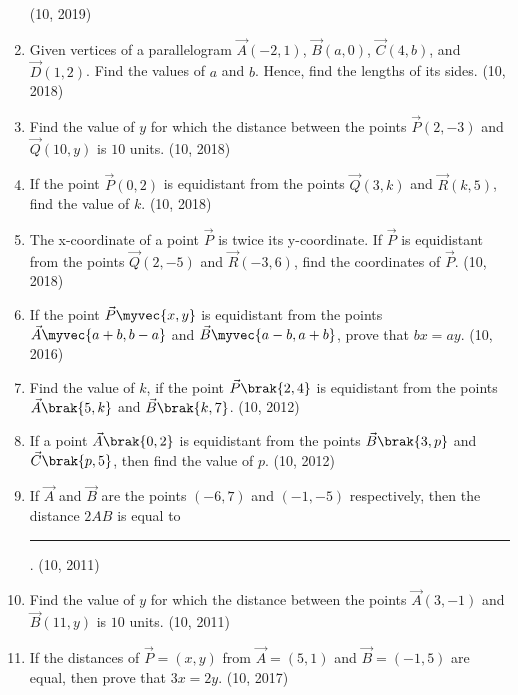 \begin{enumerate}[label=\thesubsection.\arabic*, ref=\thesubsection.\theenumi]
	\hfill (10, 2019)
    \item Given vertices of a parallelogram $\vec{A}(-2,1)$, $\vec{B}(a,0)$, $\vec{C}(4,b)$, and $\vec{D}(1,2)$. Find the values of $a$ and $b$. Hence, find the lengths of its sides. \hfill (10, 2018)
    \item Find the value of $y$ for which the distance between the points $\vec{P}(2,-3)$ and $\vec{Q}(10,y)$ is $10$ units. \hfill (10, 2018)
    \item If the point $\vec{P}(0,2)$ is equidistant from the points $\vec{Q}(3,k)$ and $\vec{R}(k,5)$, find the value of $k$. \hfill (10, 2018)
    \item The x-coordinate of a point $\vec{P}$ is twice its y-coordinate. If $\vec{P}$ is equidistant from the points $\vec{Q}(2,-5)$ and $\vec{R}(-3,6)$, find the coordinates of $\vec{P}$. \hfill (10, 2018)
    \item If the point $\vec{P} \myvec{x, y}$ is equidistant from the points $\vec{A} \myvec{a+b, b-a}$ and $\vec{B} \myvec{a-b, a+b}$, prove that $bx = ay$. \hfill (10, 2016)
\item Find the value of $k$, if the point $\vec{P}\brak{2,4}$ is equidistant from the points $\vec{A}\brak{5,k}$ and $\vec{B}\brak{k,7}$. 
\hfill (10, 2012)
\item If a point $\vec{A}\brak{0,2}$ is equidistant from the points $\vec{B}\brak{3,p}$ and $\vec{C}\brak{p,5}$, then find the value of $p$. 
\hfill (10, 2012)
\item If $\vec{A}$ and $\vec{B}$ are the points $(-6, 7)$ and $(-1, -5)$ respectively, then the distance $2AB$ is equal to
\rule{1cm}{0.2pt}.
\hfill (10, 2011)
\item Find the value of $y$ for which the distance between the points $\vec{A}(3, -1)$ and $\vec{B}(11, y)$ is $10$ units.
\hfill (10, 2011)
\item If the distances of $\vec{P} = (x, y)$ from $\vec{A} = (5, 1)$ and $\vec{B} = (-1, 5)$ are equal, then prove that $3x = 2y$. \hfill (10, 2017)
\end{enumerate}
